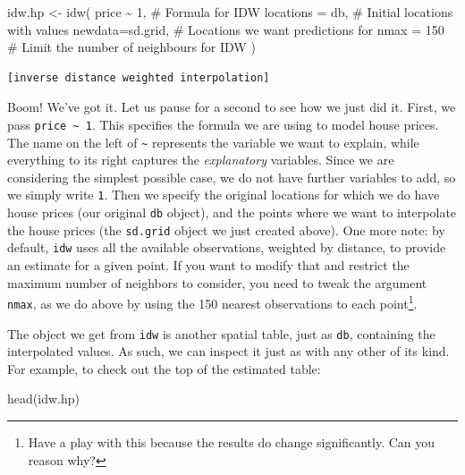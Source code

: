 \documentclass[
  letterpaper,
  DIV=11,
  numbers=noendperiod,
  oneside]{scrreprt}
\newenvironment{Shaded}{\begin{snugshade}}{\end{snugshade}}
\newcommand{\AttributeTok}[1]{\textcolor[rgb]{0.40,0.45,0.13}{#1}}
\newcommand{\CommentTok}[1]{\textcolor[rgb]{0.37,0.37,0.37}{#1}}
\newcommand{\DecValTok}[1]{\textcolor[rgb]{0.68,0.00,0.00}{#1}}
\newcommand{\FunctionTok}[1]{\textcolor[rgb]{0.28,0.35,0.67}{#1}}
\newcommand{\NormalTok}[1]{\textcolor[rgb]{0.00,0.23,0.31}{#1}}
\newcommand{\OtherTok}[1]{\textcolor[rgb]{0.00,0.23,0.31}{#1}}
\newcommand{\SpecialCharTok}[1]{\textcolor[rgb]{0.37,0.37,0.37}{#1}}
\begin{document}
\begin{Shaded}
\begin{Highlighting}[]
\NormalTok{idw.hp }\OtherTok{\textless{}{-}} \FunctionTok{idw}\NormalTok{(}
\NormalTok{  price }\SpecialCharTok{\textasciitilde{}} \DecValTok{1}\NormalTok{,         }\CommentTok{\# Formula for IDW}
  \AttributeTok{locations =}\NormalTok{ db,    }\CommentTok{\# Initial locations with values}
  \AttributeTok{newdata=}\NormalTok{sd.grid,   }\CommentTok{\# Locations we want predictions for}
  \AttributeTok{nmax =} \DecValTok{150}         \CommentTok{\# Limit the number of neighbours for IDW}
\NormalTok{)}
\end{Highlighting}
\end{Shaded}

\begin{verbatim}
[inverse distance weighted interpolation]
\end{verbatim}

Boom! We've got it. Let us pause for a second to see how we just did it.
First, we pass \texttt{price\ \textasciitilde{}\ 1}. This specifies the
formula we are using to model house prices. The name on the left of
\texttt{\textasciitilde{}} represents the variable we want to explain,
while everything to its right captures the \emph{explanatory} variables.
Since we are considering the simplest possible case, we do not have
further variables to add, so we simply write \texttt{1}. Then we specify
the original locations for which we do have house prices (our original
\texttt{db} object), and the points where we want to interpolate the
house prices (the \texttt{sd.grid} object we just created above). One
more note: by default, \texttt{idw} uses all the available observations,
weighted by distance, to provide an estimate for a given point. If you
want to modify that and restrict the maximum number of neighbors to
consider, you need to tweak the argument \texttt{nmax}, as we do above
by using the 150 nearest observations to each point\footnote{Have a play
  with this because the results do change significantly. Can you reason
  why?}.

The object we get from \texttt{idw} is another spatial table, just as
\texttt{db}, containing the interpolated values. As such, we can inspect
it just as with any other of its kind. For example, to check out the top
of the estimated table:

\begin{Shaded}
\begin{Highlighting}[]
\FunctionTok{head}\NormalTok{(idw.hp)}
\end{Highlighting}
\end{Shaded}
\end{document}
